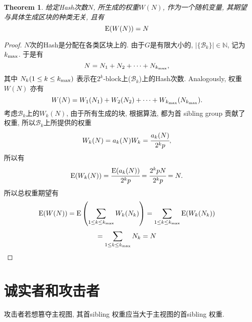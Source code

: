 \documentclass[UTF8]{ctexart}
\theoremstyle{definition}
\theoremstyle{plain}
\newtheorem{thm}{Theorem}
\begin{document}
\begin{thm}
    给定Hash次数$N$, 所生成的权重$W(N)$, 作为一个随机变量, 其期望与具体生成区块的种类无关, 且有
    \[ {\rm {E}}(W(N)) = N \]
\end{thm}
\begin{proof}
    $N$次的Hash是分配在各类区块上的. 由于$G$是有限大小的, $|\{\mathcal{B}_k\}|\in \mathbb{N}$, 记为$k_{\rm max}$.
    于是有
    \[N = N_1 + N_2 + \dots + N_{k_{\rm max}},\] 其中 $N_k (1 \le k \le k_{\rm max})$ 表示在$2^k$-block上($\mathcal{B}_k$)上的Hash次数.
    Analogously, 权重$W(N)$ 亦有
    \[W(N) = W_1(N_1) + W_2(N_2) + \dots + W_{k_{\rm max}}(N_{k_{\rm max}}).\]
    考虑$\mathcal{B}_k$上的$W_k(N)$, 由于所有生成的块, 根据算法, 都为首 sibling group 贡献了权重, 所以$\mathcal{B}_k$上所提供的权重
    \[W_k(N) = a_k(N)W_k = \cfrac{a_k(N)}{2^k p},\]所以有
    \[{\rm E}(W_k(N))=\cfrac{{\rm E}(a_k(N))}{2^k p} = \cfrac{2^k p N}{2^k p} = N.\]
    所以总权重期望有
    \[ {\rm {E}}(W(N)) ={\rm {E}}\left(\sum_{1 \le k \le k_{\rm max}} W_k(N_k)\right) =\sum_{1 \le k \le k_{\rm max}} {\rm {E}}(W_k(N_k))\]
    \[= \sum_{1 \le k \le k_{\rm max}}N_k = N\]
\end{proof}

\section{诚实者和攻击者}
攻击者若想篡夺主视图, 其首sibling 权重应当大于主视图的首sibling 权重. 








\end{document}

